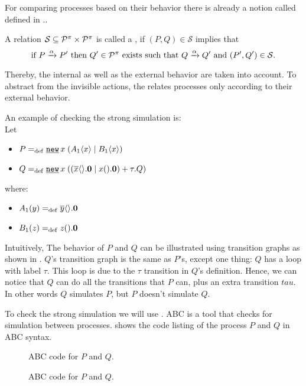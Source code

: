 For comparing processes based on their behavior there is already a notion called  defined in \cite{milnerParrowWalker}..

\begin{definition}
\label{def_strong_sim}
A relation $\mathcal{S}\subseteq\mathcal P^{\pi}\times\mathcal P^{\pi}$ is called a , if $(P,Q)\in\mathcal{S}$ implies that
\[\text{if } P \xrightarrow{\alpha} P' \text{ then }Q'\in\mathcal P^{\pi} \text{ exists such that } Q \xrightarrow{\alpha} Q' \text{ and } (P',Q')\in\mathcal{S}.\]
\end{definition}

Thereby, the internal as well as the external behavior are taken into account. To abstract from the invisible actions, the  relates processes only according to their external behavior.

An example of checking the strong simulation is:
\\Let
\begin{itemize}
\item $P\define\procres{x}{(\procpar{\proccall{A_1}{x}}{\proccall{B_1}{x}})}$ 
\item $Q\define\procres{x}{(\procchoice{(\procpar{\out{x}{}.\proczero}{\inp{x}{}.\proczero})}{\tau.Q})}$
\end{itemize}
where:
\begin{itemize}
\item $A_1(y)=_{\mathrm{def}}{}\overline{y}\langle{}\rangle.\mathbf{0}$
\item $B_1(z)=_{\mathrm{def}}{}z({}).\mathbf{0}$
\end{itemize}

Intuitively, The behavior of $P$ and $Q$ can be illustrated using transition graphs as shown in . $Q$'s transition graph is the same as $P$'s, except one thing: $Q$ has a loop with label $\tau$. This loop is due to the $\tau$ transition in $Q$'s definition. Hence, we can notice that $Q$ can do all the transitions that $P$ can, plus an extra transition $tau$. In other words $Q$ simulates $P$, but $P$ doesn't simulate $Q$.

To check the strong simulation we will use \cite{abc}. ABC is a tool that checks for simulation between  \picalc{} processes.  shows the code listing of the process $P$ and $Q$ in ABC syntax.
\begin{figure}[ht!]

\caption{ABC code for $P$ and $Q$.}
\label{pi_simulation_ABC_code}
\end{figure}

\begin{figure}[ht!]

\caption{ABC code for $P$ and $Q$.}
\label{pi_simulation_ABC_code}
\end{figure}